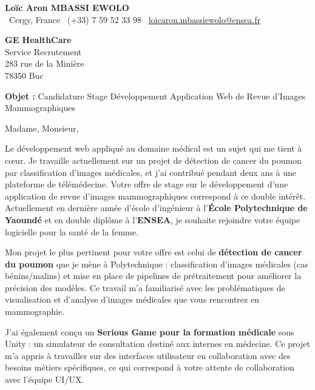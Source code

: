 \documentclass[a4paper,11pt]{article}
\begin{document}
\begin{center}
    {\Large \textbf{Loïc Aron MBASSI EWOLO}}\\[4pt]
    \small
    \faMapMarker\ Cergy, France \quad
    \faPhone\ (+33) 7 59 52 33 98 \quad
    \faEnvelope\ \href{mailto:loicaron.mbassiewolo@ensea.fr}{loicaron.mbassiewolo@ensea.fr}
\end{center}
\vspace{0.5cm}

\hfill
\begin{minipage}[t]{0.45\textwidth}
    \textbf{GE HealthCare}\\
    Service Recrutement\\
    283 rue de la Minière\\
    78350 Buc
\end{minipage}

\vspace{1cm}

\textbf{Objet :} Candidature Stage Développement Application Web de Revue d'Images Mammographiques

\vspace{0.5cm}

Madame, Monsieur,

Le développement web appliqué au domaine médical est un sujet qui me tient à cœur. Je travaille actuellement sur un projet de détection de cancer du poumon par classification d'images médicales, et j'ai contribué pendant deux ans à une plateforme de télémédecine. Votre offre de stage sur le développement d'une application de revue d'images mammographiques correspond à ce double intérêt. Actuellement en dernière année d'école d'ingénieur à l'\textbf{École Polytechnique de Yaoundé} et en double diplôme à l'\textbf{ENSEA}, je souhaite rejoindre votre équipe logicielle pour la santé de la femme.

Mon projet le plus pertinent pour votre offre est celui de \textbf{détection de cancer du poumon} que je mène à Polytechnique : classification d'images médicales (cas bénins/malins) et mise en place de pipelines de prétraitement pour améliorer la précision des modèles. Ce travail m'a familiarisé avec les problématiques de visualisation et d'analyse d'images médicales que vous rencontrez en mammographie.

J'ai également conçu un \textbf{Serious Game pour la formation médicale} sous Unity : un simulateur de consultation destiné aux internes en médecine. Ce projet m'a appris à travailler sur des interfaces utilisateur en collaboration avec des besoins métiers spécifiques, ce qui correspond à votre attente de collaboration avec l'équipe UI/UX.
\end{document}
